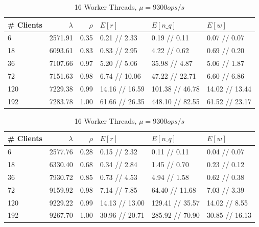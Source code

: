 \documentclass[11pt,a4paper]{article}
\begin{document}
\begin{table}
    \begin{subtable}{1.0\linewidth}\centering
        \begin{tabular}{lrrlll}
        \hline
        \# Clients &  $\lambda$&  $\rho$& $E[r]$&        $E[n\_q]$& $E[w]$\\
        \hline
          6 &    2571.91 &    0.35 &    0.21 // 2.33 &     0.19 // 0.11 &    0.07 // 0.07 \\
         18 &    6093.61 &    0.83 &    0.83 // 2.95 &     4.22 // 0.62 &    0.69 // 0.20 \\
         36 &    7107.66 &    0.97 &    5.20 // 5.06 &    35.98 // 4.87 &    5.06 // 1.87 \\
         72 &    7151.63 &    0.98 &   6.74 // 10.06 &   47.22 // 22.71 &    6.60 // 6.86 \\
        120 &    7229.38 &    0.99 &  14.16 // 16.59 &  101.38 // 46.78 &  14.02 // 13.44 \\
        192 &    7283.78 &    1.00 &  61.66 // 26.35 &  448.10 // 82.55 &  61.52 // 23.17 \\
        \hline
        \end{tabular}
        \caption{8 Worker Threads, $\mu = 7300 ops/s$}
    \end{subtable}
    \begin{subtable}{1.0\linewidth}\centering
        \begin{tabular}{lrrlll}
        \hline
        \# Clients &  $\lambda$&  $\rho$& $E[r]$&        $E[n\_q]$& $E[w]$\\
        \hline
          6 &    2577.76 &    0.28 &    0.15 // 2.32 &     0.11 // 0.11 &    0.04 // 0.07 \\
         18 &    6330.40 &    0.68 &    0.34 // 2.84 &     1.45 // 0.70 &    0.23 // 0.12 \\
         36 &    7930.72 &    0.85 &    0.73 // 4.53 &     4.94 // 1.58 &    0.62 // 0.38 \\
         72 &    9159.92 &    0.98 &    7.14 // 7.85 &   64.40 // 11.68 &    7.03 // 3.39 \\
        120 &    9229.22 &    0.99 &  14.13 // 13.00 &  129.41 // 35.57 &   14.02 // 8.55 \\
        192 &    9267.70 &    1.00 &  30.96 // 20.71 &  285.92 // 70.90 &  30.85 // 16.13 \\
        \hline
        \end{tabular}
        \caption{16 Worker Threads, $\mu = 9300 ops/s$}
    \end{subtable}
    

\end{table}
\end{document}

